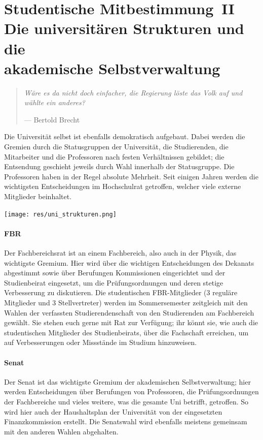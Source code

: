 \section*{Studentische Mitbestimmung~II\\Die universitären Strukturen und die \\akademische Selbstverwaltung}
\begin{multicols*}{2}
\begin{quote}
	\textit{Wäre es da nicht doch einfacher, die Regierung löste das Volk auf und wählte ein anderes?}

	\hfill--- Bertold Brecht
\end{quote}
Die Universität selbst ist ebenfalls demokratisch aufgebaut. Dabei werden die Gremien durch die Statusgruppen der Universität, die Studierenden, die Mitarbeiter und die Professoren nach festen Verhältnissen gebildet; die Entsendung geschieht jeweils durch Wahl innerhalb der Statusgruppe.
Die Professoren haben in der Regel absolute Mehrheit. Seit einigen Jahren werden die wichtigsten Entscheidungen im Hochschulrat getroffen, welcher viele externe Mitglieder beinhaltet.


\texttt{[image: res/uni\_strukturen.png]}


\paragraph{FBR}
Der Fachbereichsrat ist an einem Fachbereich, also auch in der Physik, das wichtigste Gremium.
Hier wird über die wichtigen Entscheidungen des Dekanats abgestimmt sowie über Berufungen Kommissionen eingerichtet und der Studienbeirat eingesetzt, um die Prüfungsordnungen und deren stetige Verbesserung zu diskutieren.
Die studentischen FBR-Mitglieder (3 reguläre Mitglieder und 3 Stellvertreter) werden im Sommersemester zeitgleich mit den Wahlen der verfassten Studierendenschaft von den Studierenden am Fachbereich gewählt.
Sie stehen euch gerne mit Rat zur Verfügung; ihr könnt sie, wie auch die studentischen Mitglieder des Studienbeirats, über die Fachschaft erreichen, um auf Verbesserungen oder Missstände im Studium hinzuweisen.


\paragraph{Senat}
Der Senat ist das wichtigste Gremium der akademischen Selbstverwaltung; hier werden Entscheidungen über Berufungen von Professoren, die Prüfungsordnungen der Fachbereiche und vieles weitere, was die gesamte Uni betrifft, getroffen.
So wird hier auch der Haushaltsplan der Universität von der eingesetzten Finanzkommission erstellt.
Die Senatswahl wird ebenfalls meistens gemeinsam mit den anderen Wahlen abgehalten.



\end{multicols*}
